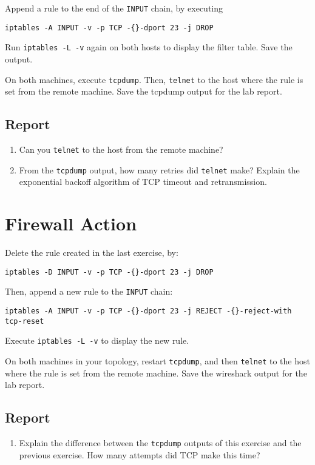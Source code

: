 \documentclass{../UTNetLab}
\begin{document}
	Append a rule to the end of the \texttt{INPUT} chain, by executing
	\begin{lstlisting}
iptables -A INPUT -v -p TCP -{}-dport 23 -j DROP
	\end{lstlisting}
	
	Run \lstinline{iptables -L -v} again on both hosts to display the filter table. Save the output.

	On both machines, execute \lstinline{tcpdump}. Then, \lstinline{telnet} to the host where the rule is set from the remote machine. Save the tcpdump output for the lab report.

	\subsection*{Report}
	\begin{enumerate}
		\item Can you \lstinline{telnet} to the host from the remote machine?
		\item From the \lstinline{tcpdump} output, how many retries did \lstinline{telnet} make? Explain the exponential backoff algorithm of TCP timeout and retransmission.
	\end{enumerate}
	
\section{Firewall Action}
	Delete the rule created in the last exercise, by:	
	\begin{lstlisting}
iptables -D INPUT -v -p TCP -{}-dport 23 -j DROP
	\end{lstlisting}
	
	Then, append a new rule to the \texttt{INPUT} chain:	
	\begin{lstlisting}
iptables -A INPUT -v -p TCP -{}-dport 23 -j REJECT -{}-reject-with tcp-reset
	\end{lstlisting}
	
	Execute \lstinline{iptables -L -v} to display the new rule.

	On both machines in your topology, restart \lstinline{tcpdump}, and then \lstinline{telnet} to the host where the rule is set from the remote machine. Save the wireshark output for the lab report.
	
	\subsection*{Report}
	\begin{enumerate}
		\setlength{\itemindent}{0pt}
		\item Explain the difference between the \lstinline{tcpdump} outputs of this exercise and the previous exercise. How many attempts did {TCP} make this time?
	\end{enumerate}
\end{document}
